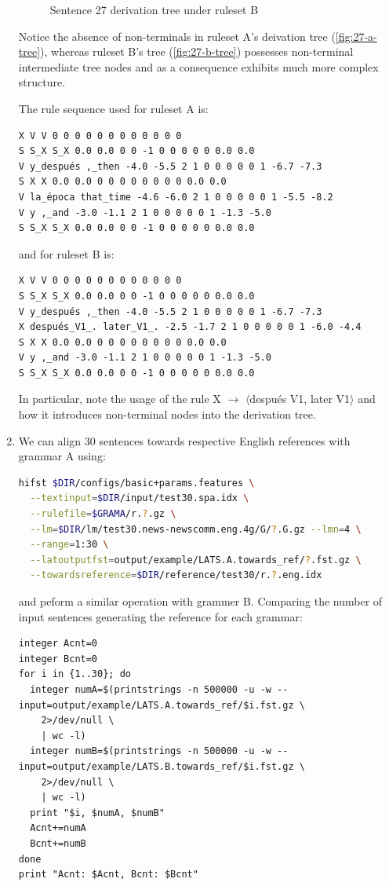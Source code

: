 \documentclass[a4paper,oneside,reqno]{amsart}
\begin{document}
\begin{enumerate}[label=\arabic*.]
\begin{figure}[h!]
\begin{center}
      \end{center}
      \caption{Sentence 27 derivation tree under ruleset B}
      \label{fig:27-b-tree}
    \end{figure}
    Notice the absence of non-terminals in ruleset A's
    deivation tree (\autoref{fig:27-a-tree}), whereas ruleset B's
    tree (\autoref{fig:27-b-tree}) possesses non-terminal intermediate tree
    nodes and as a consequence exhibits much more complex structure.

    The rule sequence used for ruleset A is:
    \begin{verbatim}
X V V 0 0 0 0 0 0 0 0 0 0 0 0
S S_X S_X 0.0 0.0 0 0 -1 0 0 0 0 0 0.0 0.0
V y_después ,_then -4.0 -5.5 2 1 0 0 0 0 0 1 -6.7 -7.3
S X X 0.0 0.0 0 0 0 0 0 0 0 0 0.0 0.0
V la_época that_time -4.6 -6.0 2 1 0 0 0 0 0 1 -5.5 -8.2
V y ,_and -3.0 -1.1 2 1 0 0 0 0 0 1 -1.3 -5.0
S S_X S_X 0.0 0.0 0 0 -1 0 0 0 0 0 0.0 0.0
    \end{verbatim}
    and for ruleset B is:
    \begin{verbatim}
X V V 0 0 0 0 0 0 0 0 0 0 0 0
S S_X S_X 0.0 0.0 0 0 -1 0 0 0 0 0 0.0 0.0
V y_después ,_then -4.0 -5.5 2 1 0 0 0 0 0 1 -6.7 -7.3
X después_V1_. later_V1_. -2.5 -1.7 2 1 0 0 0 0 0 1 -6.0 -4.4
S X X 0.0 0.0 0 0 0 0 0 0 0 0 0.0 0.0
V y ,_and -3.0 -1.1 2 1 0 0 0 0 0 1 -1.3 -5.0
S S_X S_X 0.0 0.0 0 0 -1 0 0 0 0 0 0.0 0.0
    \end{verbatim}
    In particular, note the usage of the rule X $\to$ $\langle$después V1,
    later V1$\rangle$ and how it introduces non-terminal nodes into
    the derivation tree.

  \item We can align 30 sentences towards respective English references
    with grammar A using:
    \begin{lstlisting}[language=bash]
hifst $DIR/configs/basic+params.features \
  --textinput=$DIR/input/test30.spa.idx \
  --rulefile=$GRAMA/r.?.gz \
  --lm=$DIR/lm/test30.news-newscomm.eng.4g/G/?.G.gz --lmn=4 \
  --range=1:30 \
  --latoutputfst=output/example/LATS.A.towards_ref/?.fst.gz \
  --towardsreference=$DIR/reference/test30/r.?.eng.idx
    \end{lstlisting}
    and peform a similar operation with grammer B.
    Comparing the number of input sentences generating the reference for each
    grammar:

    \begin{lstlisting}
integer Acnt=0
integer Bcnt=0
for i in {1..30}; do
  integer numA=$(printstrings -n 500000 -u -w --input=output/example/LATS.A.towards_ref/$i.fst.gz \
    2>/dev/null \
    | wc -l)
  integer numB=$(printstrings -n 500000 -u -w --input=output/example/LATS.B.towards_ref/$i.fst.gz \
    2>/dev/null \
    | wc -l)
  print "$i, $numA, $numB"
  Acnt+=numA
  Bcnt+=numB
done
print "Acnt: $Acnt, Bcnt: $Bcnt"
    \end{lstlisting}


\end{enumerate}
\end{document}

